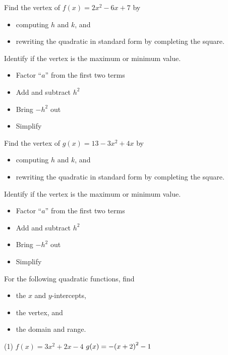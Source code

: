 \documentclass[../mathNotesPreamble]{subfiles}
\begin{document}
  \begin{ex*}
    Find the vertex of $f(x)=2x^2-6x+7$ by
    \begin{itemize}
      \item computing $h$ and $k$, and
      \item rewriting the quadratic in standard form by completing the square.
    \end{itemize}
    Identify if the vertex is the maximum or minimum value.
    \vspace*{4\baselineskip}
    \begin{itemize}
      \item Factor ``$a$'' from the first two terms
      \item Add and subtract $h^2$
      \item Bring $-h^2$ out
      \item Simplify
    \end{itemize}
  \end{ex*}
  \pagebreak

  \begin{ex*}
    Find the vertex of $g(x)=13-3x^2+4x$ by
    \begin{itemize}
      \item computing $h$ and $k$, and
      \item rewriting the quadratic in standard form by completing the square.
    \end{itemize}
    Identify if the vertex is the maximum or minimum value.
    \vspace*{4\baselineskip}
    \begin{itemize}
      \item Factor ``$a$'' from the first two terms
      \item Add and subtract $h^2$
      \item Bring $-h^2$ out
      \item Simplify
    \end{itemize}
  \end{ex*}
  \pagebreak

  \begin{ex*}
    For the following quadratic functions, find
    \begin{itemize}
      \item the $x$ and $y$-intercepts,
      \item the vertex, and
      \item the domain and range.
    \end{itemize}
    \begin{extasks}[after-item-skip=\stretch{1}](1)
      \task $f(x)=3x^2+2x-4$
      \task $g(x)=-{\left(x+2\right)}^2-1$
    \end{extasks}
  \end{ex*}
  \pagebreak
\end{document}
